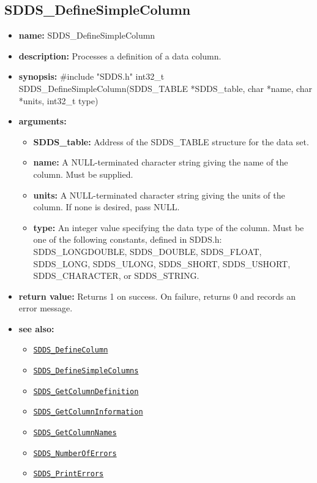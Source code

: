 \documentclass[11pt]{article}
\newcommand{\progref}[1]{\hyperref[SDDS_#1]{\tt SDDS\_#1}}
\begin{document}
\subsection{SDDS\_DefineSimpleColumn}
\label{SDDS_DefineSimpleColumn}

\begin{itemize}
\item {\bf name:}\newline
SDDS\_DefineSimpleColumn
\item {\bf description:}\newline
Processes a definition of a data column.
\item {\bf synopsis:} \#include "SDDS.h"\newline
int32\_t SDDS\_DefineSimpleColumn(SDDS\_TABLE *SDDS\_table, char *name, char *units, int32\_t type)
\item {\bf arguments:}
\begin{itemize}
\item {\bf SDDS\_table:} Address of the SDDS\_TABLE structure for the data set.
\item {\bf name:} A NULL-terminated character string giving the name of the column. Must be supplied.
\item {\bf units:} A NULL-terminated character string giving the units of the column. If none is desired, pass NULL.
\item {\bf type:} An integer value specifying the data type of the column. Must be one of the following constants, defined in  SDDS.h: SDDS\_LONGDOUBLE, SDDS\_DOUBLE, SDDS\_FLOAT, SDDS\_LONG, SDDS\_ULONG, SDDS\_SHORT, SDDS\_USHORT, SDDS\_CHARACTER, or SDDS\_STRING.
\end{itemize}
\item {\bf return value:}\newline
Returns 1 on success. On failure, returns 0 and records an error message.
\item {\bf see also:}
\begin{itemize}
\item \progref{DefineColumn}
\item \progref{DefineSimpleColumns}
\item \progref{GetColumnDefinition}
\item \progref{GetColumnInformation}
\item \progref{GetColumnNames}
\item \progref{NumberOfErrors}
\item \progref{PrintErrors}
\end{itemize}
\end{itemize}
\end{document}

